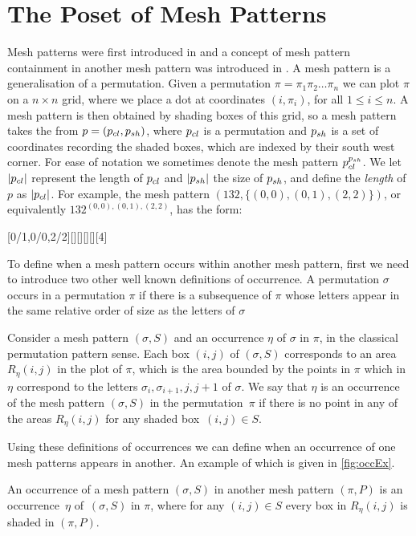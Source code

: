 \documentclass[11pt,a4paper,oneside]{article}
\begin{document}
\section{The Poset of Mesh Patterns}\label{sec:PosMP}
Mesh patterns were first introduced in \cite{Bra11} and a concept of mesh
pattern containment in another mesh pattern was introduced in \cite{TU17}. 
A mesh pattern is a generalisation of a permutation. Given a permutation
$\pi=\pi_1\pi_2\ldots\pi_n$ we can plot $\pi$ on a $n\times n$ grid,
where we place a dot at coordinates $(i,\pi_i)$, for all $1\le i\le n$.
A mesh pattern is then obtained by shading boxes of this grid, so a mesh
pattern takes the from $p=(p_{cl},p_{sh})$, where $p_{cl}$ is a permutation
and $p_{sh}$ is a set of coordinates recording the shaded boxes, which are indexed
by their south west corner. For ease of notation we sometimes denote the mesh
pattern $p_{cl}^{p_{sh}}$. We let $|p_{cl}|$ represent the length of $p_{cl}$
and $|p_{sh}|$ the size of $p_{sh}$, and define the \emph{length} of $p$ as $|p_{cl}|$.
For example, the mesh pattern $(132,\{(0,0),(0,1),(2,2)\})$,
or equivalently $132^{(0,0),(0,1),(2,2)}$, has the form:
\begin{center}
[0/1,0/0,2/2][][][][][4]
\end{center}

To define when a mesh pattern occurs within another mesh pattern, first we need to
introduce two other well known definitions of occurrence. A permutation $\sigma$
occurs in a permutation $\pi$ if there is a subsequence of $\pi$ whose letters
appear in the same relative order of size as the letters of $\sigma$

Consider a mesh pattern $(\sigma,S)$ and an occurrence $\eta$ of $\sigma$ in $\pi$, in the
classical permutation pattern sense. Each box $(i,j)$ of $(\sigma,S)$ corresponds to an
area $R_{\eta}(i,j)$ in the plot of $\pi$, which is the area bounded by the points in $\pi$
which in $\eta$ correspond to the letters $\sigma_i,\sigma_{i+1},j,j+1$ of $\sigma$.
We say that $\eta$ is an occurrence of the mesh pattern $(\sigma,S)$ in the permutation~$\pi$
if there is no point in any of the areas $R_{\eta}(i,j)$ for any shaded box~$(i,j)\in S$.

Using these definitions of occurrences we can define when an occurrence of one mesh patterns
appears in another.  An example of which is given in \cref{fig:occEx}. 

\begin{defn}[\cite{TU17}]\label{defn:meshOcc}
An occurrence of a mesh pattern $(\sigma,S)$ in another mesh 
pattern $(\pi,P)$ is an occurrence~$\eta$ of~$(\sigma,S)$ in $\pi$, where for any $(i,j)\in S$
every box in $R_\eta(i,j)$ is shaded in $(\pi,P)$.
\end{defn}
\end{document}
